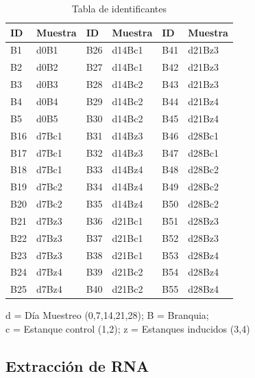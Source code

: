 \documentclass[12pt,a4paper,]{article}
\begin{document}
\begin{table}[h!]
\sffamily
\begin{center}
    \begin{threeparttable}
      \caption{Tabla de identificantes}\label{tablaidentificantes}
      \begin{tabular}{l l l l l l}
    \toprule
    \textbf{ID} & \textbf{Muestra} & \textbf{ID} & \textbf{Muestra} & \textbf{ID} & \textbf{Muestra}\\
    \midrule
    B1 & d0B1 & B26 & d14Bc1 & B41 & d21Bz3 \\
    B2 & d0B2 & B27 & d14Bc1 & B42 & d21Bz3 \\
    B3 & d0B3 & B28 & d14Bc2 & B43 & d21Bz3 \\
    B4 & d0B4 & B29 & d14Bc2 & B44 & d21Bz4 \\
    B5 & d0B5 & B30 & d14Bc2 & B45 & d21Bz4 \\
    B16 & d7Bc1 & B31 & d14Bz3 & B46 & d28Bc1 \\
    B17 & d7Bc1 & B32 & d14Bz3 & B47 & d28Bc1 \\
    B18 & d7Bc1 & B33 & d14Bz4 & B48 & d28Bc2 \\
    B19 & d7Bc2 & B34 & d14Bz4 & B49 & d28Bc2 \\
    B20 & d7Bc2 & B35 & d14Bz4 & B50 & d28Bc2 \\
    B21 & d7Bz3 & B36 & d21Bc1 & B51 & d28Bz3 \\
    B22 & d7Bz3 & B37 & d21Bc1 & B52 & d28Bz3 \\
    B23 & d7Bz3 & B38 & d21Bc1 & B53 & d28Bz4 \\
    B24 & d7Bz4 & B39 & d21Bc2 & B54 & d28Bz4 \\
    B25 & d7Bz4 & B40 & d21Bc2 & B55 & d28Bz4 \\
\bottomrule
\end{tabular}
\begin{tablenotes}
  \item d = Día Muestreo (0,7,14,21,28); B = Branquia; \\
  c = Estanque control (1,2); z = Estanques inducidos (3,4)
\end{tablenotes}
\end{threeparttable}
\end{center}
\end{table}

\clearpage

\subsection{Extracción de RNA}\label{extracciuxf3n-de-rna}
\end{document}
